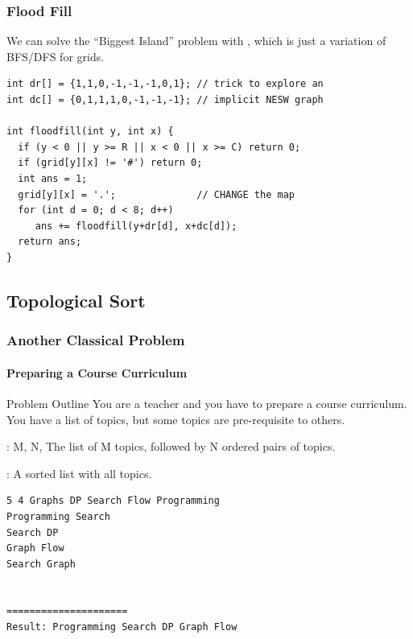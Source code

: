 \documentclass{beamer}
\begin{document}
\begin{frame}[fragile]
  \frametitle{Flood Fill}
  {\smaller
      We can solve the ``Biggest Island'' problem with
      , which is just a variation of
      BFS/DFS for grids.

  \begin{exampleblock}{}
\begin{verbatim}
int dr[] = {1,1,0,-1,-1,-1,0,1}; // trick to explore an
int dc[] = {0,1,1,1,0,-1,-1,-1}; // implicit NESW graph

int floodfill(int y, int x) {
  if (y < 0 || y >= R || x < 0 || x >= C) return 0;
  if (grid[y][x] != '#') return 0;
  int ans = 1;
  grid[y][x] = '.';              // CHANGE the map
  for (int d = 0; d < 8; d++)
     ans += floodfill(y+dr[d], x+dc[d]);
  return ans;
}
\end{verbatim}
  \end{exampleblock}
  }
\end{frame}

\subsection{Topological Sort}

\begin{frame}[fragile]
  \frametitle{Another Classical Problem}
  \framesubtitle{Preparing a Course Curriculum}
  {\smaller
  \begin{block}{Problem Outline}
    You are a teacher and you have to prepare a course curriculum.
    You have a list of topics, but some topics are pre-requisite to others.

    \bigskip

    : M, N, The list of M topics, followed by N ordered pairs of topics.

    : A sorted list with all topics.
    
  \end{block}
\begin{verbatim}
5 4 Graphs DP Search Flow Programming
Programming Search
Search DP
Graph Flow
Search Graph


=====================
Result: Programming Search DP Graph Flow
\end{verbatim}

  }
\end{frame}
\end{document}
